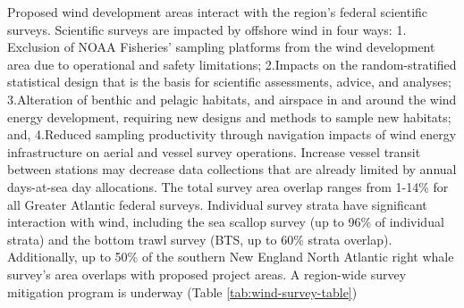\documentclass[
  10pt,
]{article}
\let\origtable\table
\let\endorigtable\endtable
\renewenvironment{table}[1][2] {
    \expandafter\origtable\expandafter[H]
} {
    \endorigtable
}
\begin{document}
\begin{table}

\caption{\label{tab:wea-landings-rev}Top ten species Landings and Revenue from Wind Energy Areas.}
\centering
{}
\end{table}

Proposed wind development areas interact with the region's federal
scientific surveys. Scientific surveys are impacted by offshore wind in
four ways: 1. Exclusion of NOAA Fisheries' sampling platforms from the
wind development area due to operational and safety limitations;
2.Impacts on the random-stratified statistical design that is the basis
for scientific assessments, advice, and analyses; 3.Alteration of
benthic and pelagic habitats, and airspace in and around the wind energy
development, requiring new designs and methods to sample new habitats;
and, 4.Reduced sampling productivity through navigation impacts of wind
energy infrastructure on aerial and vessel survey operations. Increase
vessel transit between stations may decrease data collections that are
already limited by annual days-at-sea day allocations. The total survey
area overlap ranges from 1-14\% for all Greater Atlantic federal
surveys. Individual survey strata have significant interaction with
wind, including the sea scallop survey (up to 96\% of individual strata)
and the bottom trawl survey (BTS, up to 60\% strata overlap).
Additionally, up to 50\% of the southern New England North Atlantic
right whale survey's area overlaps with proposed project areas. A
region-wide survey mitigation program is underway (Table
\ref{tab:wind-survey-table})
\end{document}
